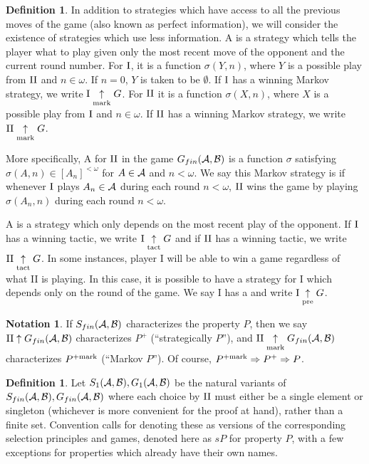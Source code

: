 \documentclass{amsart}
\theoremstyle{plain}
\theoremstyle{definition}
\newtheorem{definition}[theorem]{Definition}
\newtheorem{notation}[theorem]{Notation}
\theoremstyle{remark}
\theoremstyle{plain}
\theoremstyle{definition}
\theoremstyle{remark}
\begin{document}
\begin{definition}
 In addition to strategies which have access to all the previous moves of the game (also known as perfect information), we will consider the existence of strategies which use less information.
 A  is a strategy which tells the player what to play given only the most recent move of the opponent and the current round number.
 For \(\mathrm{I}\), it is a function \(\sigma(Y,n)\), where \(Y\) is a possible play from \(\mathrm{II}\) and \(n \in \omega\).
 If \(n = 0\), \(Y\) is taken to be \(\emptyset\).
 If \(\mathrm{I}\) has a winning Markov strategy, we write \(\mathrm{I}\underset{\text{mark}}{\uparrow} G\).
 For \(\mathrm{II}\) it is a function \(\sigma(X,n)\), where \(X\) is a possible play from \(\mathrm{I}\) and \(n \in \omega\).
 If \(\mathrm{II}\) has a winning Markov strategy, we write \(\mathrm{II}\underset{\text{mark}}{\uparrow} G\).

 More specifically, A  for \(\mathrm{II}\) in the game \(G_{fin}(\mathcal{A},\mathcal{B})\) is a function \(\sigma\) satisfying \(\sigma(A,n)\in[A_n]^{<\omega}\) for \(A\in\mathcal{A}\) and \(n<\omega\). We say this Markov strategy is  if whenever \(\mathrm{I}\) plays \(A_n\in\mathcal{A}\) during each round \(n<\omega\), \(\mathrm{II}\) wins the game by playing \(\sigma(A_n,n)\) during each round \(n<\omega\).
  
 A  is a strategy which only depends on the most recent play of the opponent.
 If \(\mathrm{I}\) has a winning tactic, we write \(\mathrm{I}\underset{\text{tact}}{\uparrow} G\) and if \(\mathrm{II}\) has a winning tactic, we write \(\mathrm{II}\underset{\text{tact}}{\uparrow} G\).
 In some instances, player I will be able to win a game regardless of what II is playing.
 In this case, it is possible to have a strategy for I which depends only on the round of the game.
 We say I has a  and write \(\mathrm{I}\underset{\text{pre}}{\uparrow} G\). 
\end{definition}

\begin{notation}
 If \(S_{fin}(\mathcal{A},\mathcal{B})\) characterizes the property \(P\), then we say \(\mathrm{II}\uparrow G_{fin}(\mathcal{A},\mathcal{B})\) characterizes \(P^+\) (``strategically \(P\)''), and \(\mathrm{II}\underset{\text{mark}}{\uparrow}G_{fin}(\mathcal{A},\mathcal{B})\) characterizes \(P^{+\mathrm{mark}}\) (``Markov \(P\)'').
 Of course, \(P^{+\mathrm{mark}}\Rightarrow P^+ \Rightarrow P\).
\end{notation}

\begin{definition}
 Let \(S_{1}(\mathcal{A},\mathcal{B}),G_{1}(\mathcal{A},\mathcal{B})\) be the natural variants of \(S_{fin}(\mathcal{A},\mathcal{B}),G_{fin}(\mathcal{A},\mathcal{B})\) where each choice by \(\mathrm{II}\) must either be a single element or singleton (whichever is more convenient for the proof at hand), rather than a finite set.
 Convention calls for denoting these as  versions of the corresponding selection principles and games, denoted here as \(sP\) for property \(P\), with a few exceptions for properties which already have their own names.
\end{definition}
\end{document}
